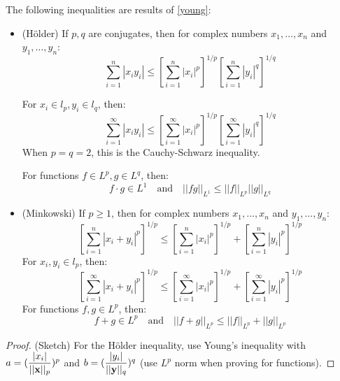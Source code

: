 \documentclass{article}
\begin{document}
\begin{cor}
    The following inequalities are results of \autoref{young}:  
    \begin{itemize}
        \item (Hölder) If $p,q$ are conjugates, then for complex numbers $x_1, \dots, x_n$ and $y_1,\dots, y_n$:    
                        \begin{equation}
                            \sum_{i=1}^n |x_i y_i| \leq \left[\sum_{i=1}^n |x_i|^p\right]^{1/p} \left[\sum_{i=1}^n |y_i|^q\right]^{1/q}
                        \end{equation}  

                    For ${x_i} \in l_p, {y_i} \in l_q$, then:  
                    \begin{equation}
                        \sum_{i=1}^{\infty} |x_i y_i| \leq \left[\sum_{i=1}^{\infty} |x_i|^p\right]^{1/p} \left[\sum_{i=1}^{\infty} |y_i|^q\right]^{1/q}
                    \end{equation}  
                    When $p=q=2$, this is the Cauchy-Schwarz inequality.  

                    For functions $f \in L^p, g \in L^q$, then:  
                        \begin{equation}
                            f \cdot g \in L^1 \quad \text{and} \quad ||fg||_{L^1} \leq ||f||_{L^p} ||g||_{L^q}
                        \end{equation}
        \item (Minkowski) If $p \geq 1$, then for complex numbers  $x_1, \dots, x_n$ and $y_1,\dots, y_n$:
                        \begin{equation}
                            \left[\sum_{i=1}^n |x_i+y_i|^p \right]^{1/p} \leq \left[\sum_{i=1}^n |x_i|^p\right]^{1/p} + \left[\sum_{i=1}^n |y_i|^p\right]^{1/p}
                        \end{equation}
                    For ${x_i}, {y_i} \in l_p$, then:
                    \begin{equation}
                        \left[\sum_{i=1}^{\infty} |x_i+y_i|^p \right]^{1/p} \leq \left[\sum_{i=1}^{\infty} |x_i|^p\right]^{1/p} + \left[\sum_{i=1}^{\infty} |y_i|^p\right]^{1/p}
                    \end{equation}
                    For functions $f, g \in L^p$, then:
                        \begin{equation}
                            f+g \in L^p \quad \text{and} \quad ||f+g||_{L^p} \leq ||f||_{L^p} + ||g||_{L^p}
                        \end{equation}
    \end{itemize}
    \begin{proof}
        (Sketch) For the Hölder inequality, use Young's inequality with $a=(\dfrac{|x_i|}{||\mathbf{x}||_p})^p$ and 
        $b=(\dfrac{|y_i|}{||\mathbf{y}||_q})^q$ (use $L^p$ norm when proving for functions).  
        

\end{proof}
\end{cor}
\end{document}
